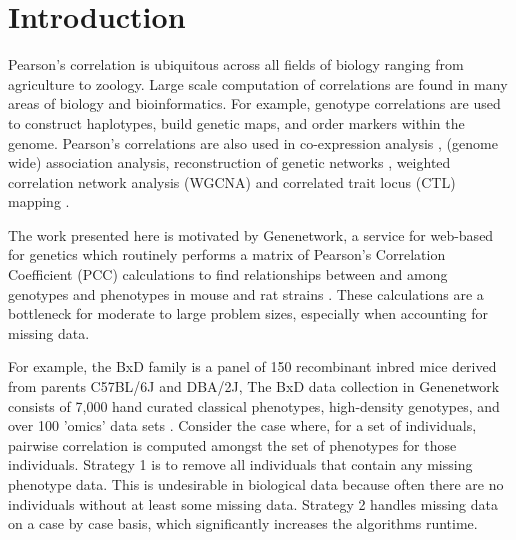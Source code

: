 \documentclass{bioinfo}
\begin{document}
\maketitle


\section{Introduction}

Pearson's correlation is ubiquitous across all fields of biology
ranging from agriculture to zoology. Large scale computation of
correlations are found in many areas of biology and bioinformatics.
For example, genotype correlations are used to construct haplotypes,
build genetic maps, and order markers within the genome. Pearson's
correlations are also used in co-expression analysis \citep{Tesson:2010},
(genome wide) association analysis, reconstruction of genetic
networks \citep{Fukushima:2013}, weighted correlation network analysis
(WGCNA) \citep{Horvath:2008} and correlated trait locus (CTL)
mapping \citep{Arends2016a}.



\enlargethispage{12pt}

The work presented here is motivated by Genenetwork, a service for
web-based for genetics which routinely performs a matrix of Pearson's
Correlation Coefficient (PCC) calculations to find relationships
between and among genotypes and phenotypes in mouse and rat
strains \citep{Sloan2016}. These calculations are a bottleneck for
moderate to large problem sizes, especially when accounting for
missing data.

For example, the BxD family is a panel of 150 recombinant inbred mice
derived from parents C57BL/6J and DBA/2J, The BxD data collection in
Genenetwork consists of 7,000 hand curated classical phenotypes,
high-density genotypes, and over 100 'omics' data
sets \citep{Ashbrook:2019}.  Consider the case where, for a set of
individuals, pairwise correlation is computed amongst the set of
phenotypes for those individuals. Strategy 1 is to remove all
individuals that contain any missing phenotype data. This is
undesirable in biological data because often there are no individuals
without at least some missing data. Strategy 2 handles missing data on
a case by case basis, which significantly increases the algorithms
runtime.
\end{document}
